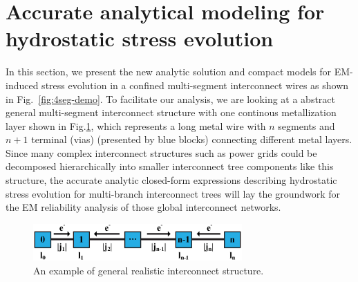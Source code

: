 \section{Accurate analytical modeling for hydrostatic stress evolution}
\label{sec:multi_segment}

In this section, we present the new analytic solution and compact
models for EM-induced stress evolution in a confined multi-segment
interconnect wires as shown in Fig.~\ref{fig:4seg-demo}. To facilitate
our analysis, we are looking at a abstract general multi-segment
interconnect structure with one continous metallization layer shown in
Fig.\ref{fig:interconnect_tree}, which represents a long metal wire
with $n$ segments and $n+1$ terminal (vias) (presented by blue blocks)
connecting different metal layers.  Since many complex interconnect
structures such as power grids could be decomposed hierarchically into
smaller interconnect tree components like this structure, the accurate
analytic closed-form expressions describing hydrostatic stress
evolution for multi-branch interconnect trees will lay the groundwork
for the EM reliability analysis of those global interconnect networks.

\label{sec:analytical_stress}
\begin{figure}[ht] \centering
\includegraphics[width=80mm]{Sn.eps}
\caption{An example of general realistic interconnect structure.}
  \label{fig:interconnect_tree}
  \vspace{-0.12in}
\end{figure}


